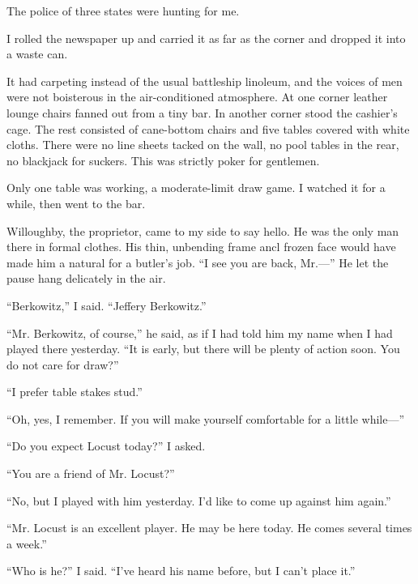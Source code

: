 \documentclass{novel}
\begin{document}
The police of three states were hunting for me.

I rolled the newspaper up and carried it as far as the corner and dropped it into a waste can.

\vspace{2\nbs}
\clearpage
\thispagestyle{empty}
\begin{ChapterStart}
\vspace{3\nbs}
\end{ChapterStart}

It had carpeting instead of the usual battleship linoleum, and the voices of men were not boisterous in the air-conditioned atmosphere. At one corner leather lounge chairs fanned out from a tiny bar. In another corner stood the cashier’s cage. The rest consisted of cane-bottom chairs and five tables covered with white cloths. There were no line sheets tacked on the wall, no pool tables in the rear, no blackjack for suckers. This was strictly poker for gentlemen.

Only one table was working, a moderate-limit draw game. I watched it for a while, then went to the bar.

Willoughby, the proprietor, came to my side to say hello. He was the only man there in formal clothes. His thin, unbending frame ancl frozen face would have made him a natural for a butler’s job. “I see you are back, Mr.—” He let the pause hang delicately in the air.

“Berkowitz,” I said. “Jeffery Berkowitz.”

“Mr. Berkowitz, of course,” he said, as if I had told him my name when I had played there yesterday. “It is early, but there will be plenty of action soon. You do not care for draw?”

“I prefer table stakes stud.”

“Oh, yes, I remember. If you will make yourself comfortable for a little while—”

“Do you expect Locust today?” I asked.

“You are a friend of Mr. Locust?”

“No, but I played with him yesterday. I’d like to come up against him again.”

“Mr. Locust is an excellent player. He may be here today. He comes several times a week.”

“Who is he?” I said. “I’ve heard his name before, but I can’t place it.”
\end{document}
